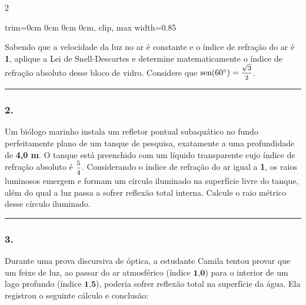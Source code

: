 \documentclass[twoside, 10pt, a4paper]{article}
\newlength{\espacoPreQuestao}\setlength{\espacoPreQuestao}{0.1cm}
\newlength{\espacoQuestao}\setlength{\espacoQuestao}{0.2cm}
\newcommand{\larguraTikz}{0.85\linewidth}
\begin{document}
\begin{multicols*}{2}
\begin{center}
\begin{adjustbox}{trim=0cm 0cm 0cm 0cm, clip, max width=\larguraTikz}
\end{adjustbox}
\end{center}
Sabendo que a velocidade da luz no ar é constante e o índice de refração do ar é \textbf{1}, aplique a Lei de Snell-Descartes e determine matematicamente o índice de refração absoluto desse bloco de vidro. Considere que $ \text{sen}(60^\circ) = \mfrac{\sqrt{3}}{2} $.
\par\vspace{\espacoQuestao}

\noindent\textcolor{CorLinha}{\rule{\linewidth}{0.5pt}} 
\par\vspace{\espacoPreQuestao}
\subsubsection*{2.} Um biólogo marinho instala um refletor pontual subaquático no fundo perfeitamente plano de um tanque de pesquisa, exatamente a uma profundidade de \textbf{4,0 m}. O tanque está preenchido com um líquido transparente cujo índice de refração absoluto é $ \mfrac{5}{4} $. Considerando o índice de refração do ar igual a \textbf{1}, os raios luminosos emergem e formam um círculo iluminado na superfície livre do tanque, além do qual a luz passa a sofrer reflexão total interna. Calcule o raio métrico desse círculo iluminado.
\par\vspace{\espacoQuestao}

\noindent\textcolor{CorLinha}{\rule{\linewidth}{0.5pt}} 
\par\vspace{\espacoPreQuestao}
\subsubsection*{3.} Durante uma prova discursiva de óptica, a estudante Camila tentou provar que um feixe de luz, ao passar do ar atmosférico (índice $ \textbf{1,0} $) para o interior de um lago profundo (índice $ \textbf{1,5} $), poderia sofrer reflexão total na superfície da água. Ela registrou o seguinte cálculo e conclusão:


\end{multicols*}
\end{document}
